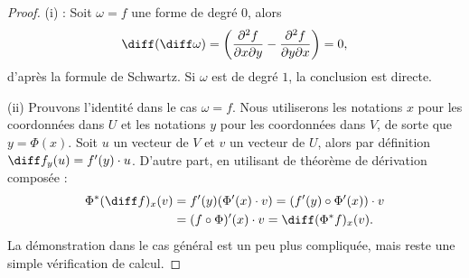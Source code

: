 \begin{proof}
(i) : Soit $\omega=f$ une forme de degré $0$, alors 
\[\diff (\diff \omega) = \left(\frac{\partial^2 f}{\partial x \partial y} -\frac{\partial^2 f}{\partial y \partial x}\right) =0,\]
d'après la formule de Schwartz. Si $\omega$ est de degré $1$, la conclusion est directe.

(ii) Prouvons l'identité dans le cas $\omega=f$. Nous utiliserons les notations $x$ pour les coordonnées dans $U$ et les notations $y$ pour les coordonnées dans $V$, de sorte que $y =\Phi(x)$. Soit $u$ un vecteur de $V$ et $v$ un vecteur de $U$, alors par définition $\diff f_y (u)=f^\prime(y) \cdot u$. D'autre part, en utilisant de théorème de dérivation composée :
\begin{align*}
\Phi^\ast (\diff f)_x (v) & = f^\prime(y) (\Phi^\prime(x) \cdot v) = (f^\prime(y) \circ \Phi^\prime(x)) \cdot v\\
&= (f \circ \Phi)^\prime(x) \cdot v = \diff (\Phi^\ast f)_x (v).
\end{align*}
La démonstration dans le cas général est un peu plus compliquée, mais reste une simple vérification de calcul.
\end{proof}
